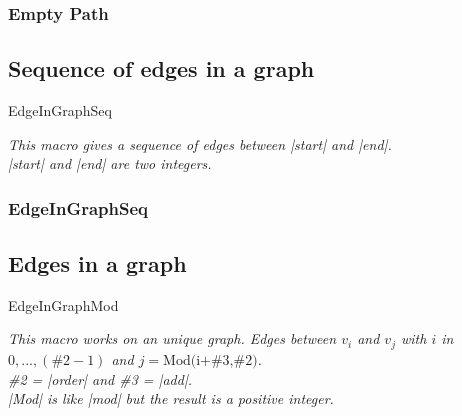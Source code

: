\subsubsection{Empty Path}
\begin{center}
\begin{tkzexample}
\end{tkzexample}
\end{center}

\vfill
\newpage  
\subsection{Sequence of edges in a graph  }
\begin{NewMacroBox}{EdgeInGraphSeq}{}

\medskip
\emph{This macro gives a sequence of edges between |start| and |end|.\\
|start| and |end| are  two integers. }
\end{NewMacroBox} 

\subsubsection{EdgeInGraphSeq}
\begin{center}
\begin{tkzexample}
\end{tkzexample}
\end{center} 

\newpage
\subsection{Edges in a graph  }
\begin{NewMacroBox}{EdgeInGraphMod}{}

\medskip
\emph{This macro works on an unique graph. Edges between $v_i$ and $v_j$ with $i$ in $0,...,(\text{\#2}-1)$  and $j=\text{Mod(i+\#3,\#2)}$.\\
\#2 = |order| and  \#3 = |add|.\\
|Mod| is like |mod| but the result is a positive integer. }
\end{NewMacroBox} 

